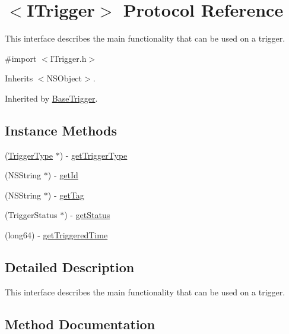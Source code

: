 \hypertarget{protocol_i_trigger-p}{}\section{$<$I\+Trigger$>$ Protocol Reference}
\label{protocol_i_trigger-p}


This interface describes the main functionality that can be used on a trigger.  




{\ttfamily \#import $<$I\+Trigger.\+h$>$}



Inherits $<$\+N\+S\+Object$>$.



Inherited by \hyperlink{interface_base_trigger}{Base\+Trigger}.

\subsection*{Instance Methods}
\begin{DoxyCompactItemize}
\item 
(\hyperlink{interface_trigger_type}{Trigger\+Type} $\ast$) -\/ \hyperlink{protocol_i_trigger-p_a4c280cb7d83e87860739a70a016792bb}{get\+Trigger\+Type}
\item 
(N\+S\+String $\ast$) -\/ \hyperlink{protocol_i_trigger-p_a8c0c8b9c7805cafdee35f8dcb26f8ee8}{get\+Id}
\item 
(N\+S\+String $\ast$) -\/ \hyperlink{protocol_i_trigger-p_a7131249647490d5ba14e6c437e75d0c6}{get\+Tag}
\item 
(Trigger\+Status $\ast$) -\/ \hyperlink{protocol_i_trigger-p_a85fede24be03d596d4a1af6380523479}{get\+Status}
\item 
(long64) -\/ \hyperlink{protocol_i_trigger-p_a0c53861a599539866ceaef9773390cab}{get\+Triggered\+Time}
\end{DoxyCompactItemize}


\subsection{Detailed Description}
This interface describes the main functionality that can be used on a trigger. 

\subsection{Method Documentation}
\hypertarget{protocol_i_trigger-p_a8c0c8b9c7805cafdee35f8dcb26f8ee8}{}
